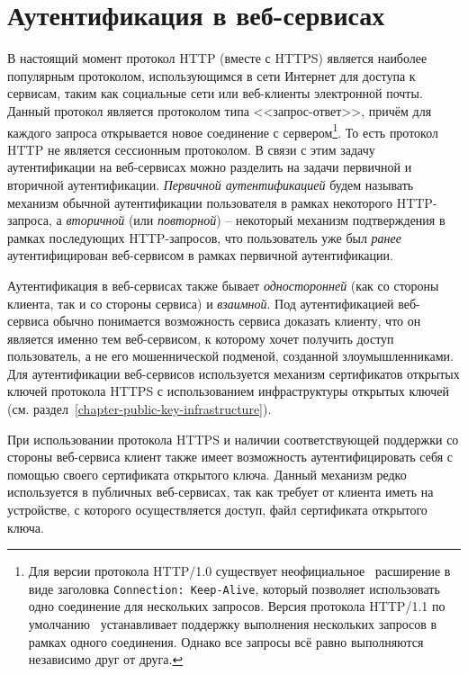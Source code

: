 \section{Аутентификация в веб-сервисах}

В настоящий момент протокол HTTP (вместе с HTTPS) является наиболее популярным протоколом, использующимся в сети Интернет для доступа к сервисам, таким как социальные сети или веб-клиенты электронной почты. Данный протокол является протоколом типа <<запрос-ответ>>, причём для каждого запроса открывается новое соединение с сервером\footnote{Для версии протокола HTTP/1.0 существует неофициальное~\cite[p.~17]{Totty:2002} расширение в виде заголовка \texttt{Connection: Keep-Alive}, который позволяет использовать одно соединение для нескольких запросов. Версия протокола HTTP/1.1 по умолчанию~\cite[6.3.~Persistence]{rfc7230} устанавливает поддержку выполнения нескольких запросов в рамках одного соединения. Однако все запросы всё равно выполняются независимо друг от друга.}. То есть протокол HTTP не является сессионным протоколом. В связи с этим задачу аутентификации на веб-сервисах можно разделить на задачи первичной и вторичной аутентификации. \emph{Первичной аутентификацией} будем называть механизм обычной аутентификации пользователя в рамках некоторого HTTP-запроса, а \emph{вторичной} (или \emph{повторной}) -- некоторый механизм подтверждения в рамках последующих HTTP-запросов, что пользователь уже был \emph{ранее} аутентифицирован веб-сервисом в рамках первичной аутентификации.

Аутентификация в веб-сервисах также бывает \emph{односторонней} (как со стороны клиента, так и со стороны сервиса) и \emph{взаимной}. Под аутентификацией веб-сервиса обычно понимается возможность сервиса доказать клиенту, что он является именно тем веб-сервисом, к которому хочет получить доступ пользователь, а не его мошеннической подменой, созданной злоумышленниками. Для аутентификации веб-сервисов используется механизм сертификатов открытых ключей протокола HTTPS с использованием инфраструктуры открытых ключей (см. раздел~\ref{chapter-public-key-infrastructure}).

При использовании протокола HTTPS и наличии соответствующей поддержки со стороны веб-сервиса клиент также имеет возможность аутентифицировать себя с помощью своего сертификата открытого ключа. Данный механизм редко используется в публичных веб-сервисах, так как требует от клиента иметь на устройстве, с которого осуществляется доступ, файл сертификата открытого ключа.

